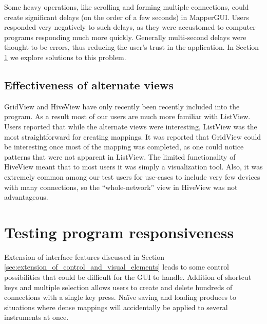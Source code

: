 Some heavy operations, like scrolling and forming multiple connections, could create significant delays (on the order of a few seconds) in MapperGUI. Users responded very negatively to such delays, as they were accustomed to computer programs responding much more quickly. Generally multi-second delays were thought to be errors, thus reducing the user's trust in the application. In Section \ref{sec:testing_program_responsiveness} we explore solutions to this problem.
	

	\subsection{Effectiveness of alternate views} %
	\label{sub:effectiveness_of_alternate_views}

GridView and HiveView have only recently been recently included into the program. As a result most of our users are much more familiar with ListView. Users reported that while the alternate views were interesting, ListView was the most straightforward for creating mappings. It was reported that GridView could be interesting once most of the mapping was completed, as one could notice patterns that were not apparent in ListView. The limited functionality of HiveView meant that to most users it was simply a visualization tool. Also, it was extremely common among our test users for use-cases to include very few devices with many connections, so the ``whole-network'' view in HiveView was not advantageous.
	
	

\section{Testing program responsiveness} %
\label{sec:testing_program_responsiveness}

Extension of interface features discussed in Section \ref{sec:extension_of_control_and_visual_elements} leads to some control possibilities that could be difficult for the GUI to handle. Addition of shortcut keys and multiple selection allows users to create and delete hundreds of connections with a single key press. Na\"{i}ve saving and loading produces to situations where dense mappings will accidentally be applied to several instruments at once.


